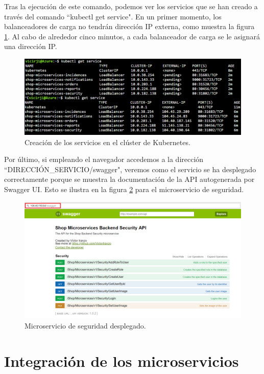 \documentclass[11pt,spanish,listoffigures]{tfgetsinf}
\begin{document}
Tras la ejecución de este comando, podemos ver los servicios que se han creado a través del comando ``kubectl get service". En un primer momento, los balanceadores de carga no tendrán dirección IP externa, como muestra la figura \ref{fig:ServiciosKubernetes}. Al cabo de alrededor cinco minutos, a cada balanceador de carga se le asignará una dirección IP.

\begin{figure}[h]
\centering
\includegraphics[scale=0.55]{ServiciosKubernetes}
\caption{Creación de los servicios en el clúster de Kubernetes.}
\label{fig:ServiciosKubernetes}
\end{figure}

Por último, si empleando el navegador accedemos a la dirección ``DIRECCIÓN\_SERVICIO/swagger", veremos como el servicio se ha desplegado correctamente porque se muestra la documentación de la API autogenerada por Swagger UI. Esto se ilustra en la figura \ref{fig:MicroservicioDesplegado} para el microservicio de seguridad.

\begin{figure}[h]
\centering
\includegraphics[scale=0.5]{MicroservicioDesplegado} 
\caption{Microservicio de seguridad desplegado.}
\label{fig:MicroservicioDesplegado}
\end{figure}

\section{Integración de los microservicios}
\end{document}
